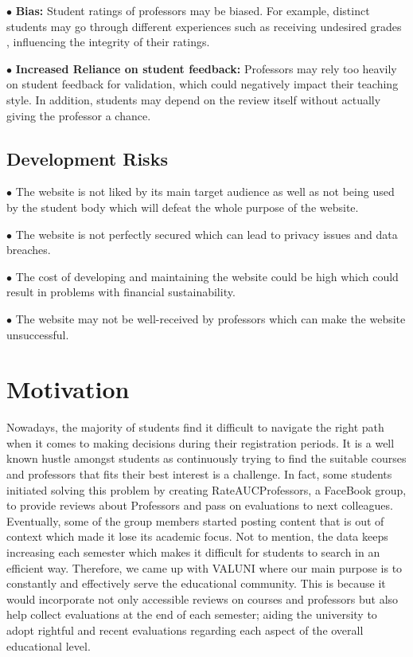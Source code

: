 \documentclass{article}
\begin{document}
$\bullet$ \textbf{Bias:} Student ratings of professors may be biased. For example, distinct students may go through different experiences such as receiving undesired grades , influencing the integrity of their ratings.

$\bullet$ \textbf{Increased Reliance on student feedback:} Professors may rely too heavily on student feedback for validation, which could negatively impact their teaching style. In addition, students may depend on the review itself without actually giving the professor a chance.

\subsection{Development Risks} 

$\bullet$ The website is not liked by its main target audience as well as not being used by the student body which will defeat the whole purpose of the website.

$\bullet$ The website is not perfectly secured which can lead to privacy issues and data breaches.

$\bullet$ The cost of developing and maintaining the website could be high which could result in problems with financial sustainability.

$\bullet$ The website may not be well-received by professors which can make the website unsuccessful.



\section{Motivation} 

\quad Nowadays, the majority of students find it difficult to navigate the right path when it comes to making decisions during their registration periods. It is a well known hustle amongst students as continuously trying  to find the suitable courses and professors that fits their best interest is a challenge.  In fact, some students initiated solving this problem by creating  RateAUCProfessors, a FaceBook group, to provide reviews about Professors and pass on evaluations to next colleagues. Eventually, some of the group members started posting content that is out of context which made it lose its academic focus. Not to mention, the data keeps increasing each semester which makes it difficult for students to search in an efficient way. Therefore, we came up with VALUNI  where our main purpose is to constantly and effectively serve the educational community. This is because it would incorporate not only accessible reviews on courses and professors but also help collect evaluations at the end of each semester; aiding the university to adopt rightful and recent evaluations regarding each aspect of the overall educational level. 
\end{document}
